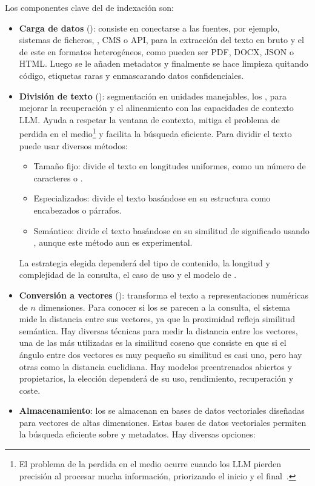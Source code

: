 Los componentes clave del  de indexación son:
\begin{itemize}
\tightlist
	\item \textbf{Carga de datos} (): consiste en conectarse a las fuentes, por ejemplo, sistemas de ficheros, , CMS o API, para la extracción del texto en bruto y el  de este en formatos heterogéneos, como pueden ser PDF, DOCX, JSON o HTML. Luego se le añaden metadatos y finalmente se hace limpieza quitando código, etiquetas raras y enmascarando datos confidenciales.
	\item \textbf{División de texto} (): segmentación en unidades manejables, los , para mejorar la recuperación y el alineamiento con las capacidades de contexto LLM. Ayuda a respetar la ventana de contexto, mitiga el problema de perdida en el medio\footnote{El problema de la perdida en el medio ocurre cuando los LLM pierden precisión al procesar mucha información, priorizando el inicio y el final~\cite{concpteo:lostmiddle}.} y facilita la búsqueda eficiente. Para dividir el texto puede usar diversos métodos:
	\begin{itemize}
		\item Tamaño fijo: divide el texto en longitudes uniformes, como un número de caracteres o .
		\item Especializados: divide el texto basándose en su estructura como encabezados o párrafos. 
		\item Semántico: divide el texto basándose en su similitud de significado usando , aunque este método aun es experimental.
	\end{itemize}
	La estrategia elegida dependerá del tipo de contenido, la longitud y complejidad de la consulta, el caso de uso y el modelo de .
	\item \textbf{Conversión a vectores} (): transforma el texto a representaciones numéricas de $n$ dimensiones. Para conocer si los  se parecen a la consulta, el sistema mide la distancia entre sus vectores, ya que la proximidad refleja similitud semántica. Hay diversas técnicas para medir la distancia entre los vectores, una de las más utilizadas es la similitud coseno que consiste en que si el ángulo entre dos vectores es muy pequeño su similitud es casi uno, pero hay otras como la distancia euclidiana. Hay modelos preentrenados abiertos y propietarios, la elección dependerá de su uso, rendimiento, recuperación y coste.
	\item \textbf{Almacenamiento}: los  se almacenan en bases de datos vectoriales diseñadas para vectores de altas dimensiones. Estas bases de datos vectoriales permiten la búsqueda eficiente sobre  y metadatos. Hay diversas opciones:

\end{itemize}
